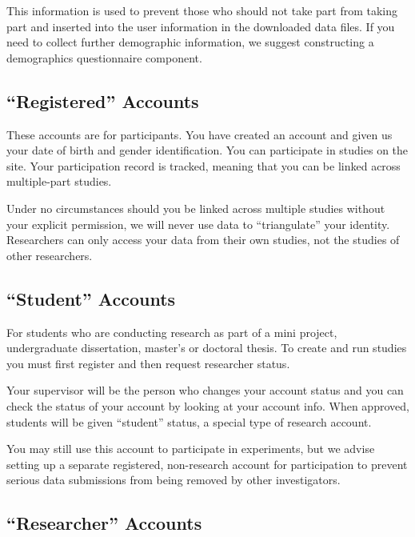 \documentclass[]{book}
\begin{document}
This information is used to prevent those who should not take part from taking part and inserted into the user information in the downloaded data files. If you need to collect further demographic information, we suggest constructing a demographics questionnaire component.

\hypertarget{registered-accounts}{%
\subsection{``Registered'' Accounts}\label{registered-accounts}}

These accounts are for participants. You have created an account and given us your date of birth and gender identification. You can participate in studies on the site. Your participation record is tracked, meaning that you can be linked across multiple-part studies.

Under no circumstances should you be linked across multiple studies without your explicit permission, we will never use data to ``triangulate'' your identity. Researchers can only access your data from their own studies, not the studies of other researchers.

\hypertarget{student-accounts}{%
\subsection{``Student'' Accounts}\label{student-accounts}}

For students who are conducting research as part of a mini project, undergraduate dissertation, master's or doctoral thesis. To create and run studies you must first register and then request researcher status.

Your supervisor will be the person who changes your account status and you can check the status of your account by looking at your account info. When approved, students will be given ``student'' status, a special type of research account.

You may still use this account to participate in experiments, but we advise setting up a separate registered, non-research account for participation to prevent serious data submissions from being removed by other investigators.

\hypertarget{researcher-accounts}{%
\subsection{``Researcher'' Accounts}\label{researcher-accounts}}
\end{document}

